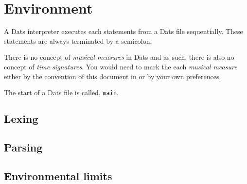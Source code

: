 \section{Environment}
\np A Dats interpreter executes each statements from a Dats file sequentially. These
statements are always terminated by a semicolon.

\np There is no concept of \textit{musical measures} in Dats and as such,
there is also no concept of \textit{time signatures}.
You would need to mark the each \textit{musical measure} either by the convention
of this document in  or by your own preferences.

\np The start of a Dats file is called, \verb+main+.

\subsection{Lexing}
\subsection{Parsing}
\subsection{Environmental limits}
